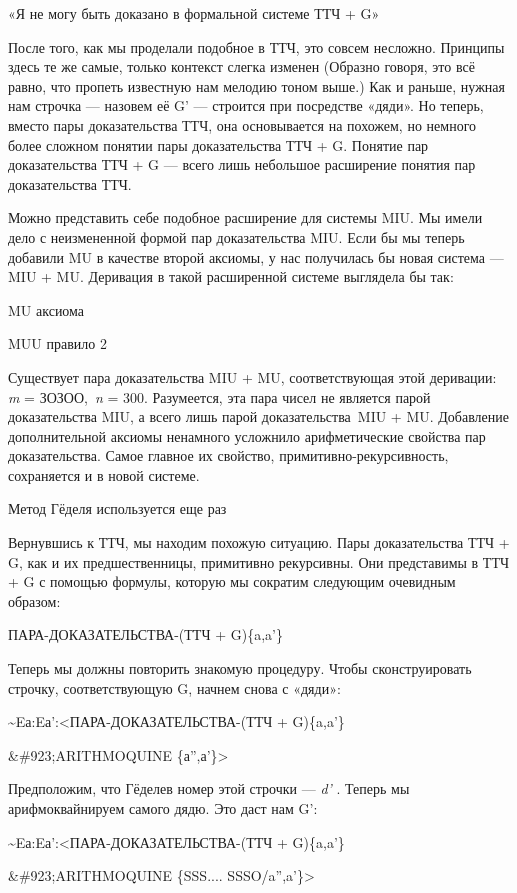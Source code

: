 \documentclass[../main.tex]{subfiles}
\begin{document}
«Я не могу быть доказано в формальной системе ТТЧ + G»

После того, как мы проделали подобное в ТТЧ, это совсем несложно. Принципы здесь те же самые, только контекст слегка изменен (Образно говоря, это всё равно, что пропеть известную нам мелодию тоном выше.) Как и раньше, нужная нам строчка --- назовем её G' --- строится при посредстве «дяди». Но теперь, вместо пары доказательства ТТЧ, она основывается на похожем, но немного более сложном понятии пары доказательства ТТЧ + G. Понятие пар доказательства ТТЧ + G --- всего лишь небольшое расширение понятия пар доказательства ТТЧ.

Можно представить себе подобное расширение для системы MIU\@. Мы имели дело с неизмененной формой пар доказательства MIU\@. Если бы мы теперь добавили MU в качестве второй аксиомы, у нас получилась бы новая система --- MIU + MU\@. Деривация в такой расширенной системе выглядела бы так:

MU аксиома

MUU правило 2

Существует пара доказательства MIU + MU, соответствующая этой деривации: \emph{m} = ЗОЗОО,~\emph{n} = 300. Разумеется, эта пара чисел не является парой доказательства MIU, а всего лишь парой доказательства~MIU + MU\@. Добавление дополнительной аксиомы ненамного усложнило арифметические свойства пар доказательства. Самое главное их свойство, примитивно-рекурсивность, сохраняется и в новой системе.

Метод Гёделя используется еще раз

Вернувшись к ТТЧ, мы находим похожую ситуацию. Пары доказательства ТТЧ + G, как и их предшественницы, примитивно рекурсивны. Они представимы в ТТЧ + G с помощью формулы, которую мы сократим следующим очевидным образом:

ПАРА-ДОКАЗАТЕЛЬСТВА-(ТТЧ + G)\{a,a'\}

Теперь мы должны повторить знакомую процедуру. Чтобы сконструировать строчку, соответствующую G, начнем снова с «дяди»:

\textasciitilde Eа:Eа':\textless ПАРА-ДОКАЗАТЕЛЬСТВА-(ТТЧ + G)\{a,a'\}

\&\#923;ARITHMOQUINE \{а'',а'\}\textgreater{}

Предположим, что Гёделев номер этой строчки --- \emph{d'} . Теперь мы арифмоквайнируем самого дядю. Это даст нам G':

\textasciitilde Eа:Eа':\textless ПАРА-ДОКАЗАТЕЛЬСТВА-(ТТЧ + G)\{a,a'\}

\&\#923;ARITHMOQUINE \{SSS.... SSSO/a'',a'\}\textgreater{}
\end{document}
